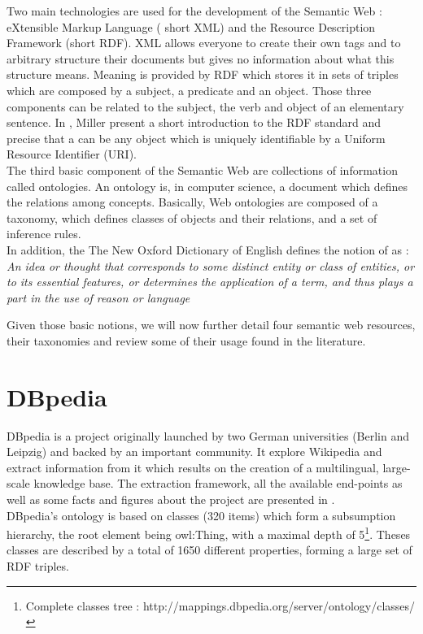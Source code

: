 Two main technologies are used for the development of the Semantic Web : eXtensible Markup Language ( short XML) and the Resource Description Framework (short RDF). XML allows everyone to create their own tags and to arbitrary structure their documents but gives no information about what this structure means. Meaning is provided by RDF which stores it in sets of triples which are composed by a subject, a predicate and an object. Those three components can be related to the subject, the verb and object of an elementary sentence. In \cite{miller1998introduction}, Miller present a short introduction to the RDF standard and precise that a  can be any object which is uniquely identifiable by a Uniform Resource Identifier (URI).\\

The third basic component of the Semantic Web are collections of information called ontologies. An ontology is, in computer science, a document which defines the relations among concepts. Basically, Web ontologies are composed of a taxonomy, which defines classes of objects and their relations, and a set of inference rules.\\

In addition, the The New Oxford Dictionary of English defines the notion of  as : \emph{An idea or thought that corresponds to some distinct entity or class of entities, or to its essential features, or determines the application of a term, and thus plays a part in the use of reason or language}

Given those basic notions, we will now further detail four semantic web resources, their taxonomies and review some of their usage found in the literature.


\section{DBpedia} %
\label{sec:dbpedia}

DBpedia is a project originally launched by two German universities (Berlin and Leipzig) and backed by an important community. It explore Wikipedia and extract information from it which results on the creation of a multilingual, large-scale knowledge base. The extraction framework, all the available end-points as well as some facts and figures about the project are presented in \cite{lehmann2014dbpedia}.\\

DBpedia's ontology is based on classes (320 items) which form a subsumption hierarchy, the root element being owl:Thing, with a maximal depth of 5\footnote{Complete classes tree : http://mappings.dbpedia.org/server/ontology/classes/}. Theses classes are described by a total of 1650 different properties, forming a large set of RDF triples.\\

